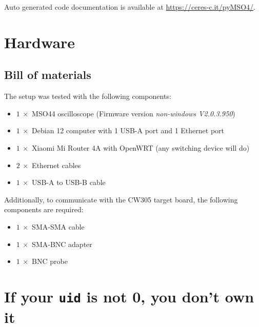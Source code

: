 \documentclass[a4paper,english,twoside,10pt]{article}
\begin{document}
\noindent Auto generated code documentation is available at \url{https://ceres-c.it/pyMSO4/}.
\section{Hardware}\label{app:hardware}
\subsection{Bill of materials}
The setup was tested with the following components:
\begin{itemize}
	\item \(1 \ \times\) MSO44 oscilloscope (Firmware version \textit{non-windows V2.0.3.950})
	\item \(1 \ \times\) Debian 12 computer with 1 USB-A port and 1 Ethernet port
	\item \(1 \ \times\) Xiaomi Mi Router 4A with OpenWRT (any switching device will do)
	\item \(2 \ \times\) Ethernet cables
	\item \(1 \ \times\) USB-A to USB-B cable
\end{itemize}
Additionally, to communicate with the CW305 target board, the following components are required:
\begin{itemize}
	\item \(1 \ \times\) SMA-SMA cable
	\item \(1 \ \times\) SMA-BNC adapter
	\item \(1 \ \times\) BNC probe
\end{itemize}
\section{If your \texttt{uid} is not 0, you don't own it}
\end{document}
